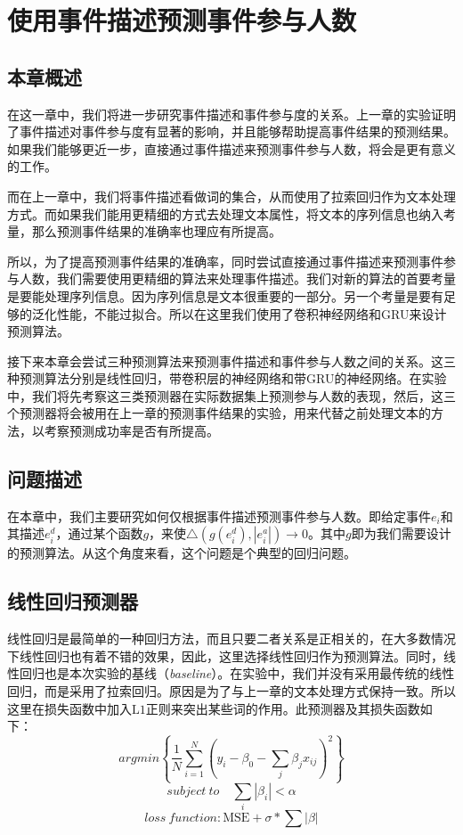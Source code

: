 % 
\section{使用事件描述预测事件参与人数}
\subsection{本章概述}
在这一章中，我们将进一步研究事件描述和事件参与度的关系。上一章的实验证明了事件描述对事件参与度有显著的影响，并且能够帮助提高事件结果的预测结果。如果我们能够更近一步，直接通过事件描述来预测事件参与人数，将会是更有意义的工作。

而在上一章中，我们将事件描述看做词的集合，从而使用了拉索回归作为文本处理方式。而如果我们能用更精细的方式去处理文本属性，将文本的序列信息也纳入考量，那么预测事件结果的准确率也理应有所提高。

所以，为了提高预测事件结果的准确率，同时尝试直接通过事件描述来预测事件参与人数，我们需要使用更精细的算法来处理事件描述。我们对新的算法的首要考量是要能处理序列信息。因为序列信息是文本很重要的一部分。另一个考量是要有足够的泛化性能，不能过拟合。所以在这里我们使用了卷积神经网络和GRU来设计预测算法。

接下来本章会尝试三种预测算法来预测事件描述和事件参与人数之间的关系。这三种预测算法分别是线性回归，带卷积层的神经网络和带GRU的神经网络。在实验中，我们将先考察这三类预测器在实际数据集上预测参与人数的表现，然后，这三个预测器将会被用在上一章的预测事件结果的实验，用来代替之前处理文本的方法，以考察预测成功率是否有所提高。

\subsection{问题描述}
在本章中，我们主要研究如何仅根据事件描述预测事件参与人数。即给定事件$e_i$和其描述$e_i^d$，通过某个函数$g$，来使$\bigtriangleup(g(e_i^d),|e_i^a|)\to 0$。其中$g$即为我们需要设计的预测算法。从这个角度来看，这个问题是个典型的回归问题。
\subsection{线性回归预测器}
线性回归是最简单的一种回归方法，而且只要二者关系是正相关的，在大多数情况下线性回归也有着不错的效果，因此，这里选择线性回归作为预测算法。同时，线性回归也是本次实验的基线（\textit{baseline}）。在实验中，我们并没有采用最传统的线性回归，而是采用了拉索回归。原因是为了与上一章的文本处理方式保持一致。所以这里在损失函数中加入$\mathrm{L1}$正则来突出某些词的作用。此预测器及其损失函数如下：
\begin{equation}
argmin\left\{\frac{1}{N}\displaystyle\sum_{i=1}^{N}
(y_i-\beta_0-\displaystyle\sum_{j}\beta_jx_{ij})^2\right\}
\end{equation}
\begin{equation}
subject\ to \quad \displaystyle\sum_{i}|\beta_i|<\alpha
\end{equation}
\begin{equation}
loss\ function: \mathrm{MSE}+\sigma*\sum|\beta|
\end{equation}

